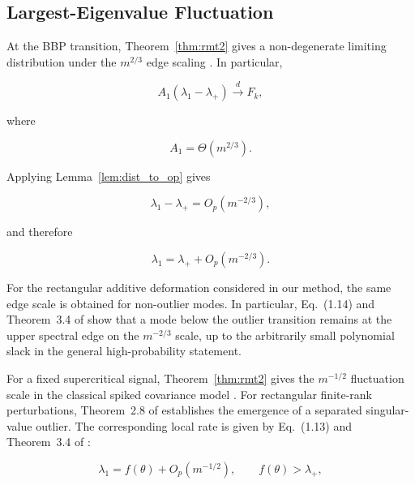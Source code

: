 \subsection{Largest-Eigenvalue Fluctuation}

At the BBP transition, Theorem~\ref{thm:rmt2} gives a non-degenerate
limiting distribution under the $m^{2/3}$ edge scaling
\cite{baik2005phase}. In particular,

\begin{equation}
A_1
\left(
\lambda_1-\lambda_+
\right)
\xrightarrow{d}
F_k,
\end{equation}

where

\begin{equation}
A_1=\Theta(m^{2/3}).
\end{equation}

Applying Lemma~\ref{lem:dist_to_op} gives

\begin{equation}
\lambda_1-\lambda_+
=
O_p(m^{-2/3}),
\end{equation}

and therefore

\begin{equation}
\lambda_1
=
\lambda_+
+
O_p(m^{-2/3}).
\label{eq:edge_fluctuation_app}
\end{equation}

For the rectangular additive deformation considered in our method,
the same edge scale is obtained for non-outlier modes. In particular,
Eq.~(1.14) and Theorem~3.4 of \cite{ding2020high} show that a mode
below the outlier transition remains at the upper spectral edge on the
$m^{-2/3}$ scale, up to the arbitrarily small polynomial slack in the
general high-probability statement.

For a fixed supercritical signal, Theorem~\ref{thm:rmt2} gives the
$m^{-1/2}$ fluctuation scale in the classical spiked covariance model
\cite{baik2005phase}. For rectangular finite-rank perturbations,
Theorem~2.8 of \cite{benaych2012singular} establishes the emergence
of a separated singular-value outlier. The corresponding local rate is
given by Eq.~(1.13) and Theorem~3.4 of \cite{ding2020high}:

\begin{equation}
\lambda_1
=
f(\theta)
+
O_p(m^{-1/2}),
\qquad
f(\theta)>\lambda_+,
\label{eq:outlier_fluctuation_app}
\end{equation}

